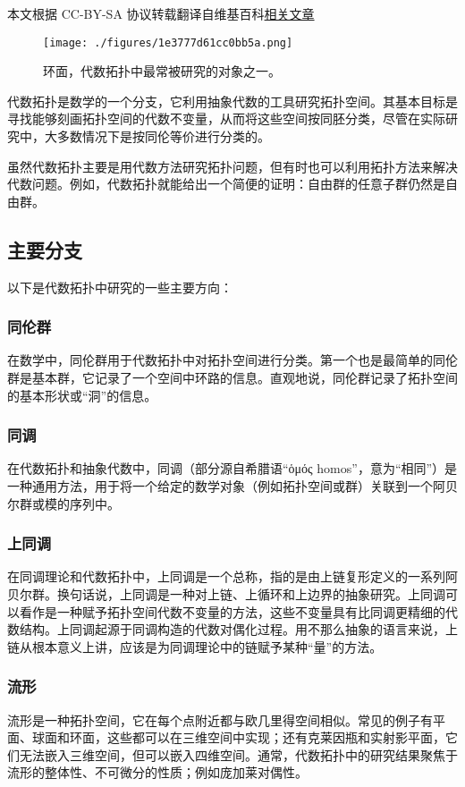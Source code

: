 
本文根据 CC-BY-SA 协议转载翻译自维基百科\href{https://en.wikipedia.org/wiki/Algebraic_topology}{相关文章}

\begin{figure}[ht]
\centering
\texttt{[image: ./figures/1e3777d61cc0bb5a.png]}
\caption{环面，代数拓扑中最常被研究的对象之一。} \label{fig_DSTP_1}
\end{figure}
代数拓扑是数学的一个分支，它利用抽象代数的工具研究拓扑空间。其基本目标是寻找能够刻画拓扑空间的代数不变量，从而将这些空间按同胚分类，尽管在实际研究中，大多数情况下是按同伦等价进行分类的。

虽然代数拓扑主要是用代数方法研究拓扑问题，但有时也可以利用拓扑方法来解决代数问题。例如，代数拓扑就能给出一个简便的证明：自由群的任意子群仍然是自由群。
\subsection{主要分支}
以下是代数拓扑中研究的一些主要方向：
\subsubsection{同伦群}
在数学中，同伦群用于代数拓扑中对拓扑空间进行分类。第一个也是最简单的同伦群是基本群，它记录了一个空间中环路的信息。直观地说，同伦群记录了拓扑空间的基本形状或“洞”的信息。
\subsubsection{同调}
在代数拓扑和抽象代数中，同调（部分源自希腊语“ὁμός homos”，意为“相同”）是一种通用方法，用于将一个给定的数学对象（例如拓扑空间或群）关联到一个阿贝尔群或模的序列中。
\subsubsection{上同调}
在同调理论和代数拓扑中，上同调是一个总称，指的是由上链复形定义的一系列阿贝尔群。换句话说，上同调是一种对上链、上循环和上边界的抽象研究。上同调可以看作是一种赋予拓扑空间代数不变量的方法，这些不变量具有比同调更精细的代数结构。上同调起源于同调构造的代数对偶化过程。用不那么抽象的语言来说，上链从根本意义上讲，应该是为同调理论中的链赋予某种“量”的方法。
\subsubsection{流形}
流形是一种拓扑空间，它在每个点附近都与欧几里得空间相似。常见的例子有平面、球面和环面，这些都可以在三维空间中实现；还有克莱因瓶和实射影平面，它们无法嵌入三维空间，但可以嵌入四维空间。通常，代数拓扑中的研究结果聚焦于流形的整体性、不可微分的性质；例如庞加莱对偶性。
